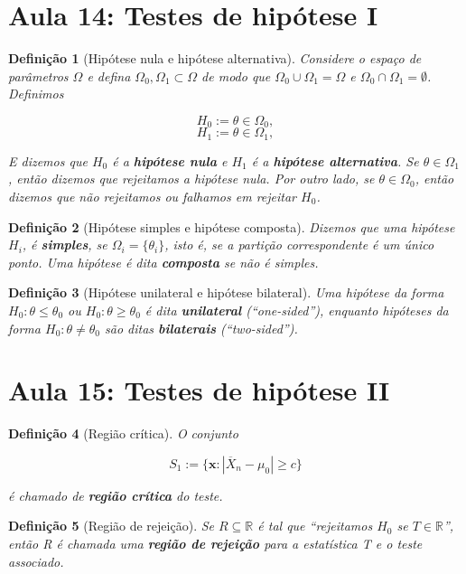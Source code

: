\documentclass{article}
\newtheorem{definition}{Definição}
\begin{document}
\section*{Aula 14: Testes de hipótese I}
\label{s14}
\begin{definition}[Hipótese nula e hipótese alternativa]
Considere o espaço de parâmetros $\Omega$ e defina $\Omega_0, \Omega_1 \subset \Omega$ de modo que $\Omega_0 \cup \Omega_1 = \Omega$ e $\Omega_0 \cap \Omega_1 = \emptyset$. Definimos

$$H_0 := \theta \in \Omega_0,$$
$$H_1 := \theta \in \Omega_1,$$

E dizemos que $H_0$ é a \textbf{hipótese nula} e $H_1$ é a \textbf{hipótese alternativa}.
Se $\theta \in \Omega_1$, então dizemos que rejeitamos a hipótese nula. Por outro lado, se $\theta \in \Omega_0$, então dizemos que não rejeitamos ou falhamos em rejeitar $H_0$.
\end{definition}

\begin{definition}[Hipótese simples e hipótese composta]
Dizemos que uma hipótese $H_i$, é \textbf{simples}, se $\Omega_i = \{ \theta_i \}$, isto é, se a partição correspondente é um único ponto. Uma hipótese é dita \textbf{composta} se não é simples.
\end{definition}

\begin{definition}[Hipótese unilateral e hipótese bilateral]
Uma hipótese da forma $H_0 : \theta \leq \theta_0$ ou $H_0 : \theta \geq \theta_0$ é dita \textbf{unilateral} (``one-sided''), enquanto hipóteses da forma $H_0 : \theta \neq \theta_0$ são ditas \textbf{bilaterais} (``two-sided'').
\end{definition}

\section*{Aula 15: Testes de hipótese II}
\label{s15}
\begin{definition}[Região crítica]
O conjunto

$$S_1 := \{ \textbf{x} : | \overline{X}_n - \mu_0 | \geq c \}$$

é chamado de \textbf{região crítica} do teste.
\end{definition}

\begin{definition}[Região de rejeição]
Se $R \subseteq \mathbb{R}$ é tal que ``rejeitamos $H_0$ se $T \in \mathbb{R}$'', então R é chamada uma \textbf{região de rejeição} para a estatística T e o teste associado.
\end{definition}
\end{document}
